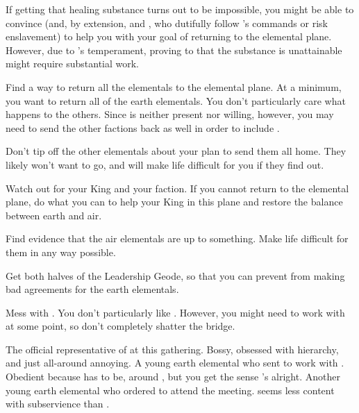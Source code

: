 \documentclass[char]{elementals}
\begin{document}
If getting that healing substance turns out to be impossible, you might be able to convince \cLoyal{\them} (and, by extension, \cMinion{} and \cMiniEarth{}, who  dutifully follow \cLoyal{}'s commands or risk enslavement) to help you with your goal of returning to the elemental plane.  However, due to \cLoyal{}'s temperament, proving to \cLoyal{\them} that the substance is unattainable might require substantial work.

\begin{itemz}[Goals]
\item Find a way to return all the elementals to the elemental plane.  At a minimum, you want to return all of the earth elementals.  You don't particularly care what happens to the others.  Since \cEarthKing{} is neither present nor willing, however, you may need to send the other factions back as well in order to include \cEarthKing{\them}.
   \item Don't tip off the other elementals about your plan to send them all home.  They likely won't want to go, and will make life difficult for you if they find out.
   \item Watch out for your King and your faction.  If you cannot return to the elemental plane, do what you can to help your King in this plane and restore the balance between earth and air.
   \item Find evidence that the air elementals are up to something.  Make life difficult for them in any way possible.
   \item Get both halves of the Leadership Geode, so that you can prevent \cLoyal{} from making bad agreements for the earth elementals.
   \item Mess with \cLoyal{}.  You don't particularly like \cLoyal{\them}.  However, you might need to work with \cLoyal{\them} at some point, so don't completely shatter the bridge.
\end{itemz}

\begin{contacts}
	\contact{\cLoyal{}}  The official representative of \cEarthKing{} at this gathering.  Bossy, obsessed with hierarchy, and just all-around annoying.
	\contact{\cMinion{}}  A young earth elemental who \cEarthKing{} sent to work with \cLoyal{}.  Obedient because \cMinion{\they} has to be, around \cLoyal{}, but you get the sense \cMinion{\they}'s  alright.
  \contact{\cMiniEarth{}}  Another young earth elemental who \cLoyal{} ordered to attend the meeting.  \cMiniEarth{\They} seems less content with subservience than \cMinion{}.
\end{contacts}
\end{document}
